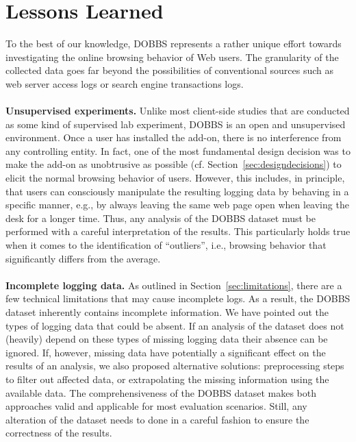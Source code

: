 \documentclass[11pt,fleqn,twoside]{article}
\begin{document}
\section{Lessons Learned}
\label{sec:lessonslearned}
To the best of our knowledge, DOBBS represents a rather unique effort towards investigating the online browsing behavior of Web users. The granularity of the collected data goes far beyond the possibilities of conventional sources such as web server access logs or search engine transactions logs. 
\\
\\
\textbf{Unsupervised experiments.}
Unlike most client-side studies that are conducted as some kind of supervised lab experiment, DOBBS is an open and unsupervised environment. Once a user has installed the add-on, there is no interference from any controlling entity. In fact, one of the most fundamental design decision was to make the add-on as unobtrusive as possible (cf. Section~\ref{sec:designdecisions}) to elicit the normal browsing behavior of users. However, this includes, in principle, that users can consciously manipulate the resulting logging data by behaving in a specific manner, e.g., by always leaving the same web page open when leaving the desk for a longer time. Thus, any analysis of the DOBBS dataset must be performed with a careful interpretation of the results. This particularly holds true when it comes to the identification of ``outliers'', i.e., browsing behavior that significantly differs from the average.
\\
\\
\textbf{Incomplete logging data.}
As outlined in Section~\ref{sec:limitations}, there are a few technical limitations that may cause incomplete logs. As a result, the DOBBS dataset inherently contains incomplete information. We have pointed out the types of logging data that could be absent. If an analysis of the dataset does not (heavily) depend on these types of missing logging data their absence can be ignored. If, however, missing data have potentially a significant effect on the results of an analysis, we also proposed alternative solutions: preprocessing steps to filter out affected data, or extrapolating the missing information using the available data. The comprehensiveness of the DOBBS dataset makes both approaches valid and applicable for most evaluation scenarios. Still, any alteration of the dataset needs to done in a careful fashion to ensure the correctness of the results.
\\
\\
\end{document}
